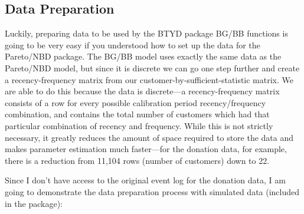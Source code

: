 \documentclass[10pt, letterpaper, onecolumn, oneside, final]{article}\usepackage[]{graphicx}\usepackage[]{color}
\begin{document}
\subsection{Data Preparation}

Luckily, preparing data to be used by the BTYD package BG/BB functions
is going to be very easy if you understood how to set up the data for
the Pareto/NBD package. The BG/BB model uses exactly the same data as
the Pareto/NBD model, but since it is discrete we can go one step
further and create a recency-frequency matrix from our
customer-by-sufficient-statistic matrix. We are able to do this
because the data is discrete---a recency-frequency matrix consists of
a row for every possible calibration period recency/frequency
combination, and contains the total number of customers which had that
particular combination of recency and frequency. While this is not
strictly necessary, it greatly reduces the amount of space required to
store the data and makes parameter estimation much faster---for the
donation data, for example, there is a reduction from 11,104 rows
(number of customers) down to 22.

Since I don't have access to the original event log for the donation
data, I am going to demonstrate the data preparation process with
simulated data (included in the package):
\end{document}
